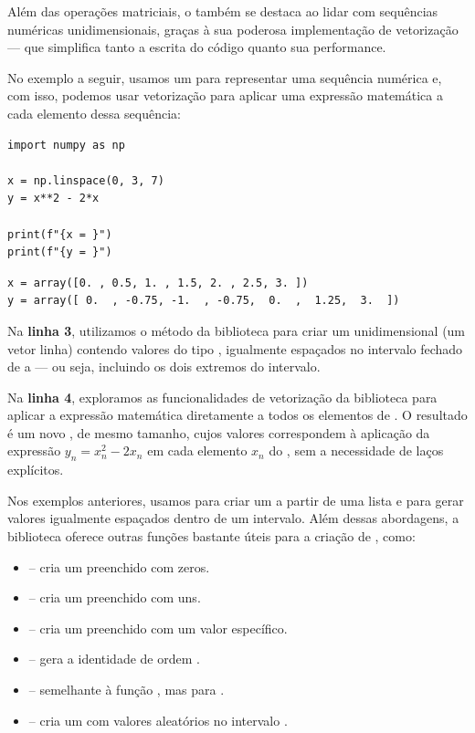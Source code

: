 Além das operações matriciais, o  também se destaca ao lidar com sequências numéricas unidimensionais,
graças à sua poderosa implementação de vetorização --- que simplifica tanto a escrita do código quanto sua performance.

No exemplo a seguir, usamos um  para representar uma sequência numérica e, com isso, podemos usar
vetorização para aplicar uma expressão matemática a cada elemento dessa sequência:
\begin{verbatim}
import numpy as np

x = np.linspace(0, 3, 7)
y = x**2 - 2*x

print(f"{x = }")
print(f"{y = }")
\end{verbatim}
\begin{verbatim}
x = array([0. , 0.5, 1. , 1.5, 2. , 2.5, 3. ])
y = array([ 0.  , -0.75, -1.  , -0.75,  0.  ,  1.25,  3.  ])
\end{verbatim}

Na \textbf{linha 3}, utilizamos o método  da biblioteca  para criar um 
unidimensional (um vetor linha) contendo  valores do tipo , igualmente espaçados no intervalo fechado de  a
 --- ou seja, incluindo os dois extremos do intervalo.

Na \textbf{linha 4}, exploramos as funcionalidades de vetorização da biblioteca  para aplicar a
expressão matemática diretamente a todos os elementos de .
O resultado é um novo , de mesmo tamanho, cujos valores correspondem à aplicação da expressão
$y_n = x_n^2 - 2x_n$ em cada elemento $x_n$ do , sem a necessidade de laços explícitos.

Nos exemplos anteriores, usamos  para criar um  a partir de uma
lista e  para gerar valores igualmente espaçados dentro de um intervalo.
Além dessas abordagens, a biblioteca  oferece outras funções bastante úteis para a criação de
, como:
\begin{itemize}
\item []  -- cria um  preenchido com zeros.
\item []  -- cria um  preenchido com uns.
\item []  -- cria um  preenchido com um valor específico.
\item []  -- gera a  identidade de ordem .
\item []  -- semelhante à função , mas para .
\item []  -- cria um  com valores aleatórios no intervalo \inlcode{[0, 1)}.
\end{itemize}

